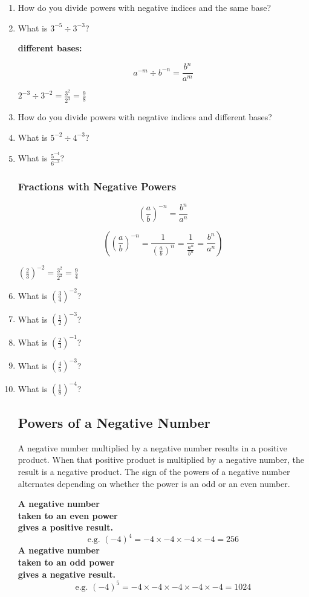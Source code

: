 \documentclass{article}
\begin{document}
\begin{enumerate}
\item How do you divide powers with negative indices and the same base?
\item What is $3^{-5}\div 3^{-3}$?

\textbf{different bases:}
\begin{Large}
$$a^{-m} \div b^{-n}=\frac{b^n}{a^m}$$
\end{Large}
\begin{center}
$2^{-3}\div3^{-2}=\frac{3^2}{2^3}=\frac{9}{8}$
\end{center}

\item How do you divide powers with negative indices and different bases?
\item What is $5^{-2}\div4^{-3}$?
\item What is $\frac{5^{-4}}{6^{-3}}$?

\subsubsection*{Fractions with Negative Powers}
\begin{Large}
$$(\frac{a}{b})^{-n}=\frac{b^n}{a^n}$$
\end{Large}
$$((\frac{a}{b})^{-n}=\frac{1}{({\frac{a}{b}})^n}=\frac{1}{\frac{a^n}{b^n}}=\frac{b^n}{a^n})$$
\begin{center}
$(\frac{2}{3})^{-2}=\frac{3^2}{2^2}=\frac{9}{4}$
\end{center}

\item What is $\left(\frac{3}{4}\right)^{-2}$?
\item What is $\left(\frac{1}{2}\right)^{-3}$?
\item What is $\left(\frac{2}{3}\right)^{-1}$?
\item What is $\left(\frac{4}{5}\right)^{-3}$?
\item What is $\left(\frac{1}{8}\right)^{-4}$?

\subsection*{Powers of a Negative Number}
A negative number multiplied by a negative number results in a positive product. When that positive product is multiplied by a negative number, the result is a negative product. The sign of the powers of a negative number alternates depending on whether the power is an odd or an even number.

\textbf{A negative number\\ taken to an even power\\ gives a positive result.}
$$\text{e.g. }(-4)^4 = -4 \times -4 \times -4 \times -4 = 256$$
\textbf{A negative number\\ taken to an odd power\\ gives a negative result.}
$$\text{e.g. }(-4)^5 = -4 \times -4 \times -4 \times -4 \times -4 = 1024$$


\end{enumerate}
\end{document}
